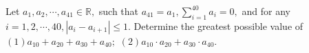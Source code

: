 Let $a_1,a_2,\cdots,a_{41}\in\mathbb{R},$ such that $a_{41}=a_1, \sum_{i=1}^{40}a_i=0,$ and for any $i=1,2,\cdots,40, |a_i-a_{i+1}|\leq 1.$ Determine the greatest possible value of
$(1)a_{10}+a_{20}+a_{30}+a_{40};$
$(2)a_{10}\cdot a_{20}+a_{30}\cdot a_{40}.$